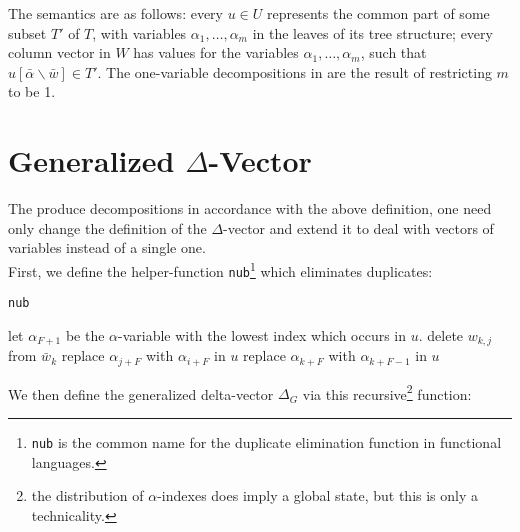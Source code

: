 \documentclass[a4paper, 11pt]{report}
\newcommand{\nub}{\texttt{nub}}
\begin{document}
The semantics are as follows: every $u \in U$ represents the common part of some subset $T'$ of $T$, with variables $\alpha_1,\dots,\alpha_m$ in
the leaves of its tree structure; every column vector in $W$
has values for the variables $\alpha_1,\dots,\alpha_m$, such that $u[\bar{\alpha} \backslash \bar{w}] \in T'$.
The one-variable decompositions in \cite[Ch. 5]{cutIntro2013} are the result of restricting $m$ to be 1.

\section{Generalized $\Delta$-Vector}

The produce decompositions in accordance with the above definition, one need only change the definition of the $\Delta$-vector and extend it to deal with vectors of variables instead of a single one.\\

\noindent
First, we define the helper-function \texttt{nub}\footnote{\texttt{nub} is the common name for the duplicate elimination function in functional languages.} which eliminates duplicates:

\begin{algorithm}
\caption{\nub}
\label{alg.DeltaG}
\begin{algorithmic}
\Function{\nub}{$(u, (\bar{w}_1,\dots,\bar{w}_q)$}
  \State let $\alpha_{F+1}$ be the $\alpha$-variable with the lowest index which occurs in $u$.
    \State delete $w_{k,j}$ from $\bar{w}_k$ \EndFor
    \State replace $\alpha_{j+F}$ with $\alpha_{i+F}$ in $u$
    \State replace $\alpha_{k+F}$ with $\alpha_{k+F-1}$ in $u$ \EndFor
  \EndWhile
\EndFunction
\end{algorithmic}
\end{algorithm}

\noindent
We then define the generalized delta-vector $\Delta_G$ via this recursive\footnote{the distribution of $\alpha$-indexes does imply a global state, but this is only a technicality.} function:
\end{document}
